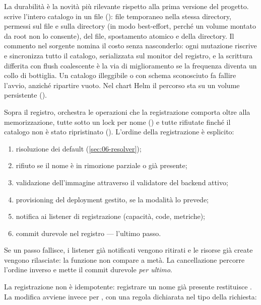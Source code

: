 La durabilit\`a \`e la novit\`a pi\`u rilevante rispetto alla prima versione del
progetto.  scrive l'intero catalogo in un file
(): file temporaneo nella stessa directory, permessi
 sul file e  sulla directory (in modo best-effort, perch\'e un
volume montato da root non lo consente),  del file, spostamento atomico
e  della directory. Il commento nel sorgente nomina il costo senza
nasconderlo: ogni mutazione riscrive e sincronizza tutto il catalogo, serializzata
sul monitor del registro, e la scrittura differita con flush coalescente \`e la
via di miglioramento se la frequenza diventa un collo di bottiglia. Un catalogo
illeggibile o con schema sconosciuto fa fallire l'avvio, anzich\'e ripartire vuoto.
Nel chart Helm il percorso sta su un volume persistente ().

Sopra il registro,  orchestra le operazioni che la
registrazione comporta oltre alla memorizzazione, tutte sotto un lock per nome
() e tutte rifiutate finch\'e il catalogo non \`e
stato ripristinato (). L'ordine della registrazione
\`e esplicito:

\begin{enumerate}
  \item risoluzione dei default (\cref{sec:06-resolver});
  \item rifiuto se il nome \`e in rimozione parziale o gi\`a presente;
  \item validazione dell'immagine attraverso il validatore del backend attivo;
  \item provisioning del deployment gestito, se la modalit\`a lo prevede;
  \item notifica ai listener di registrazione (capacit\`a, code, metriche);
  \item commit durevole nel registro --- l'ultimo passo.
\end{enumerate}

Se un passo fallisce, i listener gi\`a notificati vengono ritirati e le risorse
gi\`a create vengono rilasciate: la funzione non compare a met\`a. La cancellazione
percorre l'ordine inverso e mette il commit durevole \emph{per ultimo}.

La registrazione non \`e idempotente: registrare un nome gi\`a presente
restituisce . La modifica avviene invece per
, con una regola dichiarata nel tipo della richiesta:

